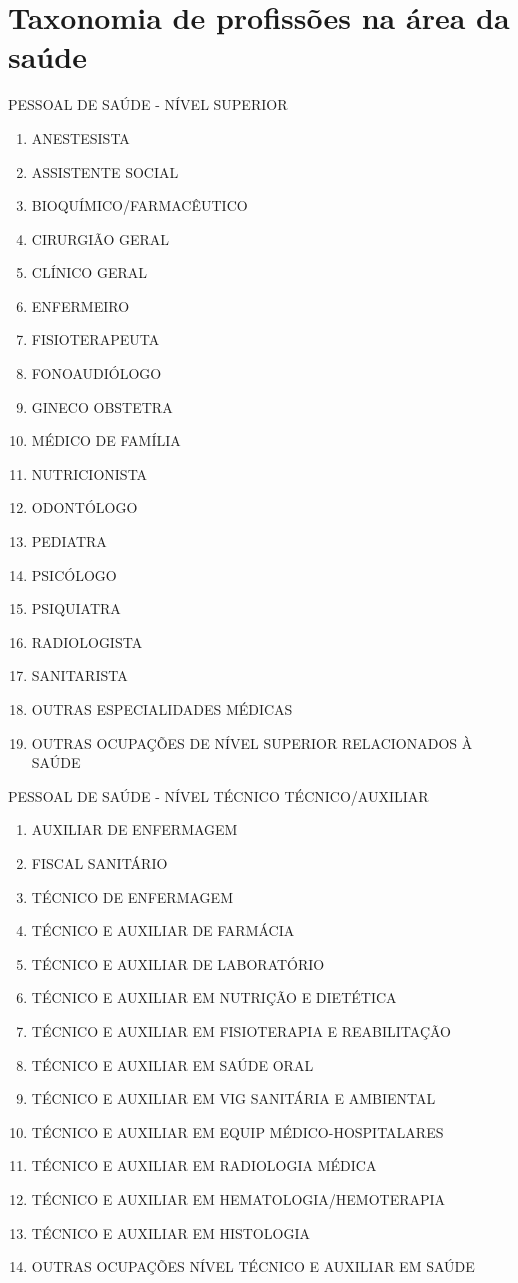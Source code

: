 \documentclass[a4paper,11pt]{article}
\begin{document}
\section{Taxonomia de profissões na área da saúde}
\label{app:taxonomiaProfissões}
PESSOAL DE SAÚDE - NÍVEL SUPERIOR
\begin{enumerate}
    \item ANESTESISTA
    \item ASSISTENTE SOCIAL
    \item BIOQUÍMICO/FARMACÊUTICO
    \item CIRURGIÃO GERAL
    \item CLÍNICO GERAL
    \item ENFERMEIRO
    \item FISIOTERAPEUTA
    \item FONOAUDIÓLOGO
    \item GINECO OBSTETRA
    \item MÉDICO DE FAMÍLIA
    \item NUTRICIONISTA
    \item ODONTÓLOGO
    \item PEDIATRA
    \item PSICÓLOGO
    \item PSIQUIATRA
    \item RADIOLOGISTA
    \item SANITARISTA
    \item OUTRAS ESPECIALIDADES MÉDICAS
    \item OUTRAS OCUPAÇÕES DE NÍVEL SUPERIOR RELACIONADOS À SAÚDE
\end{enumerate}
PESSOAL DE SAÚDE - NÍVEL TÉCNICO TÉCNICO/AUXILIAR
\begin{enumerate}
    \item AUXILIAR DE ENFERMAGEM
    \item FISCAL SANITÁRIO
    \item TÉCNICO DE ENFERMAGEM
    \item TÉCNICO E AUXILIAR DE FARMÁCIA
    \item TÉCNICO E AUXILIAR DE LABORATÓRIO
    \item TÉCNICO E AUXILIAR EM NUTRIÇÃO E DIETÉTICA
    \item TÉCNICO E AUXILIAR EM FISIOTERAPIA E REABILITAÇÃO
    \item TÉCNICO E AUXILIAR EM SAÚDE ORAL
    \item TÉCNICO E AUXILIAR EM VIG SANITÁRIA E AMBIENTAL
    \item TÉCNICO E AUXILIAR EM EQUIP MÉDICO-HOSPITALARES
    \item TÉCNICO E AUXILIAR EM RADIOLOGIA MÉDICA
    \item TÉCNICO E AUXILIAR EM HEMATOLOGIA/HEMOTERAPIA
    \item TÉCNICO E AUXILIAR EM HISTOLOGIA
    \item OUTRAS OCUPAÇÕES NÍVEL TÉCNICO E AUXILIAR EM SAÚDE
\end{enumerate}
\end{document}
